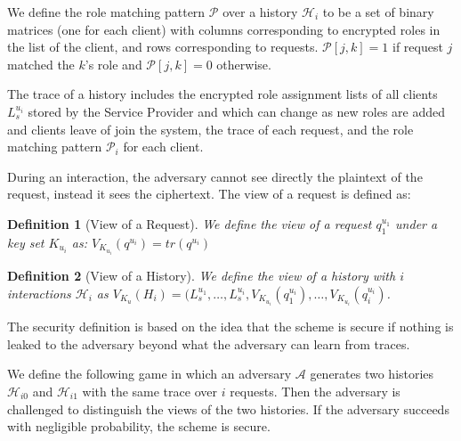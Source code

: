 \documentclass[epsfig,a4paper,11pt,titlepage]{book}
\newtheorem{definition}{Definition}
\numberwithin{algorithm}{chapter}
\begin{document}
We define the role matching pattern $\mathcal{P}$ over a history $\mathcal{H}_i$ to be a set of  binary matrices (one for each client) with columns corresponding to encrypted roles in the list of the client, and rows corresponding to requests. $\mathcal{P}[j,k]=1$ if request $j$ matched the $k$'s role and $\mathcal{P}[j,k]=0$ otherwise.

The trace of a history includes the encrypted role assignment lists of all clients $L_s^{u_i}$ stored by the Service Provider and which can change as new roles are added and clients leave of join the system, the trace of each request, and the role matching pattern $\mathcal{P}_i$ for each client.

During an interaction, the adversary cannot see directly the plaintext of the request, instead it sees the ciphertext. The view of a request is defined as:

\begin{definition}[View of a Request]
We define the view of a request $q_{1}^{u_1}$ under a key set $K_{u_i}$ as: 
$V_{K_{u_i}}(q^{u_i})= tr(q^{u_i})$
\end{definition}

\begin{definition}[View of a History]
We define the view of a history with $i$ interactions $\mathcal{H}_i$ as 
$V_{K_u}(H_i) = (L_s^{u_1}, \ldots, L_s^{u_i}, V_{K_{u_i}}(q_1^{u_i}), \ldots, V_{K_{u_i}}(q_i^{u_i})$.
\end{definition}

The security definition is based on the idea that the scheme is secure if nothing is leaked to the adversary beyond what the adversary can learn from traces.

We define the following game in which an adversary $\mathcal{A}$ generates two histories $\mathcal{H}_{i0}$ and $\mathcal{H}_{i1}$ with the same trace over $i$ requests. Then the adversary is challenged to distinguish the views of the two histories. If the adversary succeeds with negligible probability, the scheme is secure.
\end{document}
